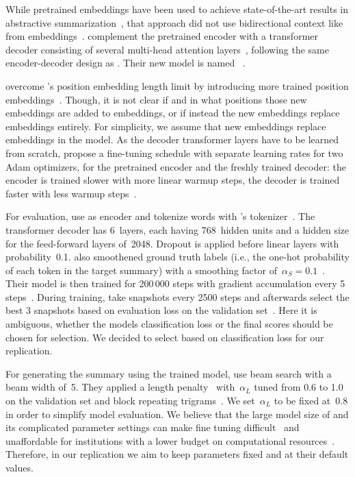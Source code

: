 While pretrained \Elmo embeddings have been used to achieve state-of-the-art results in abstractive summarization~\cite{EdunovBA2019}, that approach did not use bidirectional context like from \Bert embeddings~\cite{DevlinCLT2019}. 
\citeauthor{LiuL2019} complement the pretrained \Bert encoder with a transformer decoder consisting of several multi-head attention layers~\cite{LiuL2019,VaswaniSPUJGKP2017}, following the same encoder-decoder design as \textcite{SeeLM2017}. Their new model is named \BertSumAbs~\cite{LiuL2019}.

\citeauthor{LiuL2019} overcome \Bert's position embedding length limit by introducing more trained position embeddings~\cite{LiuL2019}. Though, it is not clear if and in what positions those new embeddings are added to \Bert embeddings, or if instead the new embeddings replace \Bert embeddings entirely. For simplicity, we assume that new embeddings replace \Bert embeddings in the \BertSumAbs model.
As the decoder transformer layers have to be learned from scratch, \citeauthor{LiuL2019} propose a fine-tuning schedule with separate learning rates for two Adam optimizers, for the pretrained \Bert encoder and the freshly trained decoder: the encoder is trained slower with more linear warmup steps, the decoder is trained faster with less warmup steps~\cite{LiuL2019}.

For evaluation, \citeauthor{LiuL2019} use \BertBase as encoder and tokenize words with \Bert's \WordPiece tokenizer~\cite{LiuL2019}.
The transformer decoder has 6~layers, each having 768~hidden units and a hidden size for the feed-forward layers of~2048. Dropout is applied before linear layers with probability~0.1.
\citeauthor{LiuL2019} also smoothened ground truth labels (i.e., the one-hot probability of each token in the target summary) with a smoothing factor of~\(\alpha_S = 0.1\)~\cite{LiuL2019,SzegedyVISW2016}.
Their model is then trained for 200\,000 steps with gradient accumulation every 5 steps~\cite{LiuL2019}.
During training, \citeauthor{LiuL2019} take snapshots every 2500 steps and afterwards select the best 3 snapshots based on evaluation loss on the validation set~\cite{LiuL2019}.
Here it is ambiguous, whether the models classification loss or the final \Rouge scores should be chosen for selection. We decided to select based on classification loss for our replication.

For generating the summary using the trained model, \citeauthor{LiuL2019} use beam search with a beam width of~5. They applied a length penalty~\cite{WuSCLNMKCGMKSJL2016} with~\(\alpha_L\) tuned from 0.6 to 1.0 on the validation set and block repeating trigrams~\cite{PaulusXS2018}.
We set~\(\alpha_L\) to be fixed at~0.8 in order to simplify model evaluation.
We believe that the large model size of \BertSumAbs and its complicated parameter settings can make fine tuning difficult~\cite{AghajanyanSGGZG2020} and unaffordable for institutions with a lower budget on computational resources~\cite{JiaoYSJCL0L2020}.
Therefore, in our replication we aim to keep parameters fixed and at their default values.

